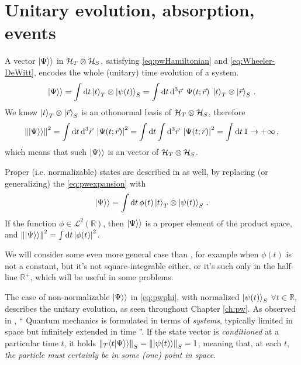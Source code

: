\section{Unitary evolution, absorption, events}

A vector $|\Psi\rangle\rangle$ in $\mathcal{H}_T \otimes \mathcal{H}_S$,
satisfying \eqref{eq:pwHamiltonian} and \eqref{eq:Wheeler-DeWitt},
encodes the whole (unitary) time evolution of a system.
\begin{equation}\label{eq:pwexpansion}
  |\Psi\rangle\rangle =
    \int \dd{t} \ket{t}_T \otimes \ket{\psi(t)}_S =
    \int \dd{t}\dd[3]{\vec{r}} \ \Psi(t; \vec{r}) \; \ket{t}_T \otimes \ket{\vec{r}}_S
    \,  \text{.}
\end{equation}
We know $\ket{t}_T \otimes \ket{\vec{r}}_S$ is an othonormal basis of $\mathcal{H}_T \otimes \mathcal{H}_S$, therefore
\begin{equation}
  \norm{|\Psi\rangle\rangle}^2 =
    \int \dd{t}\dd[3]{\vec{r}} \ \abs{\Psi(t; \vec{r})}^2 =
    \int \dd{t} \int \dd[3]{\vec{r}} \ \abs{\Psi(t; \vec{r})}^2 =
    \int \dd{t} 1 \rightarrow +\infty
    \,  \text{,}
\end{equation}
which means that such $|\Psi\rangle\rangle$ is an  vector of $\mathcal{H}_T \otimes \mathcal{H}_S$.

Proper (i.e. normalizable) states are described in \cite{Lloyd:Time} as well, by replacing (or generalizing)
the \eqref{eq:pwexpansion} with
\begin{equation}\label{eq:pwphi}
  |\Psi\rangle\rangle =
    \int \dd{t} \phi(t) \ket{t}_T \otimes \ket{\psi(t)}_S \, \text{.}
\end{equation}
If the function $\phi \in \mathcal{L}^2(\mathbb{R})$,
then $|\Psi\rangle\rangle$ is a proper element of the product space,
and $\norm{|\Psi\rangle\rangle}^2 = \int \dd{t} \abs{\phi(t)}^2$.

We will consider some even more general case than \cite{Lloyd:Time},
for example when $\phi(t)$ is not a constant, but it's not square-integrable either,
or it's such only in the half-line $\mathbb{R}^{+}$,
which will be useful in some problems.

The case of non-normalizable $|\Psi\rangle\rangle$ in \eqref{eq:pwphi},
with normalized $\ket{\psi(t)}_S$ $\forall t \in \mathbb{R}$,
describes the unitary evolution, as seen throughout Chapter \ref{ch:pw}.
As observed in \cite{Maccone:QGR},
``%
  Quantum mechanics is formulated in terms of \emph{systems},
  typically limited in space but infinitely extended in time%
''.
If the state vector is \emph{conditioned} at a particular time $t$,
it holds $\norm{_{T}\langle t | \Psi \rangle\rangle}_S = \norm{\ket{\psi(t)}}_S = 1$,
meaning that, at each $t$,
\emph{the particle must certainly be in some (one) point in space}.

